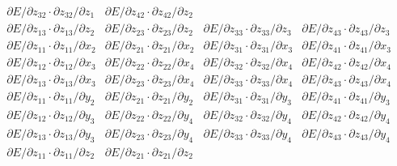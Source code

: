 \begin{equation}
\begin{array}{cccc}
\partial{E} / \partial{z_{32}} \cdot \partial{z_{32}} / \partial{z_1} & 
\partial{E} / \partial{z_{42}} \cdot \partial{z_{42}} / \partial{z_2} \\
\partial{E} / \partial{z_{13}} \cdot \partial{z_{13}} / \partial{z_2} & 
\partial{E} / \partial{z_{23}} \cdot \partial{z_{23}} / \partial{z_2} &
\partial{E} / \partial{z_{33}} \cdot \partial{z_{33}} / \partial{z_3} & 
\partial{E} / \partial{z_{43}} \cdot \partial{z_{43}} / \partial{z_3} \\
\partial{E} / \partial{z_{11}} \cdot \partial{z_{11}} / \partial{x_2} & 
\partial{E} / \partial{z_{21}} \cdot \partial{z_{21}} / \partial{x_2} &
\partial{E} / \partial{z_{31}} \cdot \partial{z_{31}} / \partial{x_3} & 
\partial{E} / \partial{z_{41}} \cdot \partial{z_{41}} / \partial{x_3} \\
\partial{E} / \partial{z_{12}} \cdot \partial{z_{12}} / \partial{x_3} & 
\partial{E} / \partial{z_{22}} \cdot \partial{z_{22}} / \partial{x_4} &
\partial{E} / \partial{z_{32}} \cdot \partial{z_{32}} / \partial{x_4} & 
\partial{E} / \partial{z_{42}} \cdot \partial{z_{42}} / \partial{x_4} \\
\partial{E} / \partial{z_{13}} \cdot \partial{z_{13}} / \partial{x_3} & 
\partial{E} / \partial{z_{23}} \cdot \partial{z_{23}} / \partial{x_4} &
\partial{E} / \partial{z_{33}} \cdot \partial{z_{33}} / \partial{x_4} & 
\partial{E} / \partial{z_{43}} \cdot \partial{z_{43}} / \partial{x_4} \\
\partial{E} / \partial{z_{11}} \cdot \partial{z_{11}} / \partial{y_2} & 
\partial{E} / \partial{z_{21}} \cdot \partial{z_{21}} / \partial{y_2} &
\partial{E} / \partial{z_{31}} \cdot \partial{z_{31}} / \partial{y_3} & 
\partial{E} / \partial{z_{41}} \cdot \partial{z_{41}} / \partial{y_3} \\
\partial{E} / \partial{z_{12}} \cdot \partial{z_{12}} / \partial{y_3} & 
\partial{E} / \partial{z_{22}} \cdot \partial{z_{22}} / \partial{y_4} &
\partial{E} / \partial{z_{32}} \cdot \partial{z_{32}} / \partial{y_4} & 
\partial{E} / \partial{z_{42}} \cdot \partial{z_{42}} / \partial{y_4} \\
\partial{E} / \partial{z_{13}} \cdot \partial{z_{13}} / \partial{y_3} & 
\partial{E} / \partial{z_{23}} \cdot \partial{z_{23}} / \partial{y_4} &
\partial{E} / \partial{z_{33}} \cdot \partial{z_{33}} / \partial{y_4} & 
\partial{E} / \partial{z_{43}} \cdot \partial{z_{43}} / \partial{y_4} \\
\partial{E} / \partial{z_{11}} \cdot \partial{z_{11}} / \partial{z_2} & 
\partial{E} / \partial{z_{21}} \cdot \partial{z_{21}} / \partial{z_2} &

\end{array}
\end{equation}
